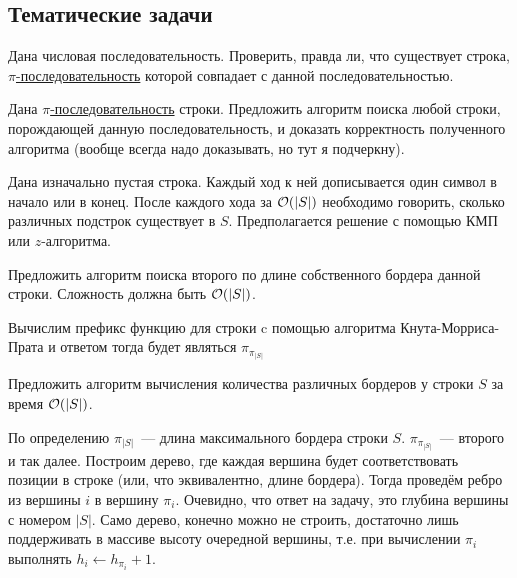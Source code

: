 \documentclass[addpoints]{exam}
\begin{document}
\begin{questions}

\section{Тематические задачи}

\question[\half] \label{check_pi} Дана числовая последовательность. Проверить, правда ли, что существует строка, \hyperref[piseq]{$\pi$-последовательность} которой совпадает с данной последовательностью.  

\question[\half] \label{inverse_pi} Дана \hyperref[piseq]{$\pi$-последовательность} строки. Предложить алгоритм поиска любой строки, порождающей данную последовательность, и доказать корректность полученного алгоритма (вообще всегда надо доказывать, но тут я подчеркну).

\question[\half] Дана изначально пустая строка. Каждый ход к ней дописывается один символ в начало или в конец. После каждого хода за $\mathcal{O}(|S|)$ необходимо говорить, сколько различных подстрок существует в $S$. Предполагается решение с помощью КМП или $z$-алгоритма.

\question[\half] Предложить алгоритм поиска второго по длине собственного бордера данной строки. Сложность должна быть $\mathcal{O}(|S|)$.

\begin{solution}

Вычислим префикс функцию для строки c помощью алгоритма Кнута-Морриса-Прата и ответом тогда будет являться $\pi_{\pi_{|S|}}$

\end{solution}

\question[\half] Предложить алгоритм вычисления количества различных бордеров у строки $S$ за время $\mathcal{O}(|S|)$. 

\begin{solution}

По определению $\pi_{|S|}$~--- длина максимального бордера строки $S$. $\pi_{\pi_{|S|}}$~--- второго и так далее. Построим дерево, где каждая вершина будет соответствовать позиции в строке (или, что эквивалентно, длине бордера). Тогда проведём ребро из вершины $i$ в вершину $\pi_{i}$. Очевидно, что ответ на задачу, это глубина вершины с номером $|S|$. Само дерево, конечно можно не строить, достаточно лишь поддерживать в массиве высоту очередной вершины, т.е. при вычислении $\pi_i$ выполнять $h_i \leftarrow h_{\pi_i} + 1$.

\end{solution}


\end{questions}
\end{document}
